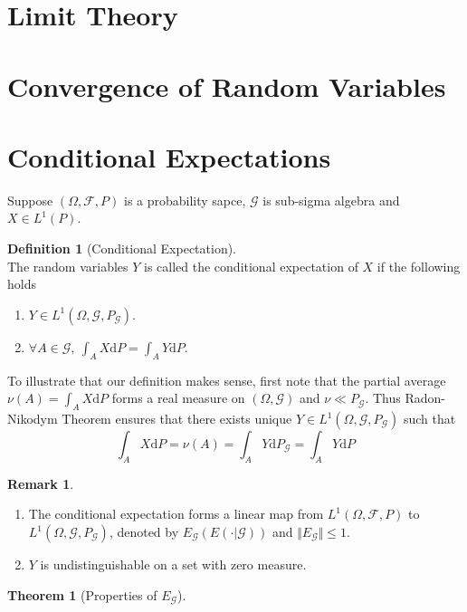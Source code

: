 \documentclass[12pt]{book}
\theoremstyle{definition}
\newtheorem{definition}{Definition}[chapter]
\newtheorem{theorem}{Theorem}[chapter]
\newtheorem{remark}{Remark}
\newcommand{\D}{\mathrm{d}}
\begin{document}
\section{Limit Theory}
\section{Convergence of Random Variables}




\section{Conditional Expectations}
Suppose $(\Omega,\mathcal{F},P)$ is a probability sapce, $\mathcal G$ is sub-sigma algebra and $X \in L^1(P)$.
\begin{definition}[Conditional Expectation] \ \\
The random variables $Y$ is called the conditional expectation of $X$ if the following  holds
\begin{enumerate}
  \item $Y \in L^1(\Omega,\mathcal{G},P_{\mathcal{G}}).$
  \item $\forall A \in \mathcal{G}, \ \int_A X \D P = \int_A Y \D P.$ 
\end{enumerate}

\end{definition}
To illustrate that our definition makes sense, first note that the partial average $\nu(A)=\int_A X \D P$ forms a real measure on $(\Omega,\mathcal{G})$ and $\nu \ll P_{\mathcal G}$. Thus Radon-Nikodym Theorem  ensures that there exists unique $Y\in L^1(\Omega,\mathcal{G},P_{\mathcal{G}})$ such that 
$$
 \int_A X \D P  = \nu(A) = \int_A Y \D P_{\mathcal G} = \int_A Y \D P
$$

\begin{remark}\
\begin{enumerate}
	\item The conditional expectation forms a linear map from $L^1(\Omega,\mathcal{F},P)$	to $L^1(\Omega,\mathcal{G},P_{\mathcal{G}})$, denoted by $E_{\mathcal G}(E(\cdot|\mathcal G))$ and $\Vert E_{\mathcal G}\Vert\leq 1$.
	\item $Y$ is undistinguishable on a set with zero measure.
\end{enumerate}
\end{remark}

\begin{theorem}[Properties of $E_\mathcal{G}$]
	
\end{theorem}
\end{document}
